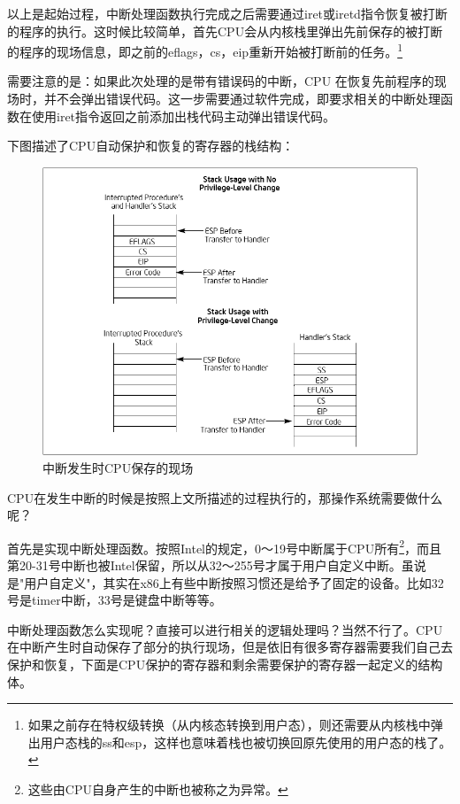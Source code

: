 \par 以上是起始过程，中断处理函数执行完成之后需要通过iret或iretd指令恢复被打断的程序的执行。这时候比较简单，首先CPU会从内核栈里弹出先前保存的被打断的程序的现场信息，即之前的eflags，cs，eip重新开始被打断前的任务。\footnote{如果之前存在特权级转换（从内核态转换到用户态），则还需要从内核栈中弹出用户态栈的ss和esp，这样也意味着栈也被切换回原先使用的用户态的栈了。}
\par 需要注意的是：如果此次处理的是带有错误码的中断，CPU 在恢复先前程序的现场时，并不会弹出错误代码。这一步需要通过软件完成，即要求相关的中断处理函数在使用iret指令返回之前添加出栈代码主动弹出错误代码。

\par 下图描述了CPU自动保护和恢复的寄存器的栈结构：
\begin{figure}[ht]
      \centering
      \includegraphics[scale=0.4]{picture/chapt7/interrupt_stack.png}
      \caption{中断发生时CPU保存的现场}
\end{figure}

\par CPU在发生中断的时候是按照上文所描述的过程执行的，那操作系统需要做什么呢？

\par 首先是实现中断处理函数。按照Intel的规定，0～19号中断属于CPU所有\footnote{这些由CPU自身产生的中断也被称之为异常。}，而且第20-31号中断也被Intel保留，所以从32～255号才属于用户自定义中断。虽说是"用户自定义"，其实在x86上有些中断按照习惯还是给予了固定的设备。比如32号是timer中断，33号是键盘中断等等。

\par 中断处理函数怎么实现呢？直接可以进行相关的逻辑处理吗？当然不行了。CPU在中断产生时自动保存了部分的执行现场，但是依旧有很多寄存器需要我们自己去保护和恢复，下面是CPU保护的寄存器和剩余需要保护的寄存器一起定义的结构体。

